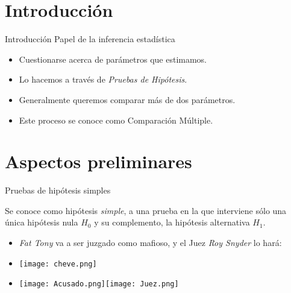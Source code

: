 \section{Introducción}
\begin{frame}{Introducción}
    Papel de la inferencia estadística
    \begin{itemize}[<+- | alert@+>]
        \item Cuestionarse acerca de parámetros que estimamos.
        \item Lo hacemos a través de \textit{Pruebas de Hipótesis}.
        \item Generalmente queremos comparar más de dos parámetros.
        \item Este proceso se conoce como Comparación Múltiple.
    \end{itemize}
\end{frame}
\section{Aspectos preliminares}
\begin{frame}{Pruebas de hipótesis simples}
    \begin{df}
        Se conoce como hipótesis \textit{simple}, a una prueba en la que interviene sólo una única hipótesis nula $H_0$ y su complemento, la hipótesis alternativa $H_1$.
    \end{df}
    \begin{example}
        \begin{itemize}[<+- | alert@+>]
        \item \textit{Fat Tony} va a ser juzgado como mafioso, y el Juez \textit{Roy Snyder} lo hará:
            \item \texttt{[image: cheve.png]}
            \item \texttt{[image: Acusado.png]}\quad \quad  \texttt{[image: Juez.png]}
        \end{itemize}
    \end{example}
\end{frame}

